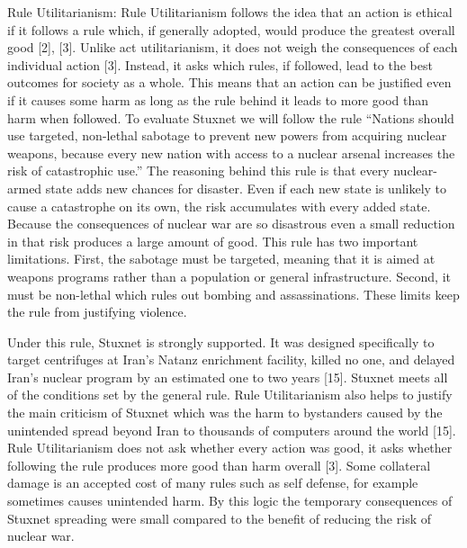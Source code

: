Rule Utilitarianism:
Rule Utilitarianism follows the idea that an action is ethical if it follows a rule which, if generally adopted, would produce the greatest overall good [2], [3]. Unlike act utilitarianism, it does not weigh the consequences of each individual action [3]. Instead, it asks which rules, if followed, lead to the best outcomes for society as a whole. This means that an action can be justified even if it causes some harm as long as the rule behind it leads to more good than harm when followed. To evaluate Stuxnet we will follow the rule “Nations should use targeted, non-lethal sabotage to prevent new powers from acquiring nuclear weapons, because every new nation with access to a nuclear arsenal increases the risk of catastrophic use.” The reasoning behind this rule is that every nuclear-armed state adds new chances for disaster. Even if each new state is unlikely to cause a catastrophe on its own, the risk accumulates with every added state. Because the consequences of nuclear war are so disastrous even a small reduction in that risk produces a large amount of good. This rule has two important limitations. First, the sabotage must be targeted, meaning that it is aimed at weapons programs rather than a population or general infrastructure. Second, it must be non-lethal which rules out bombing and assassinations. These limits keep the rule from justifying violence.

Under this rule, Stuxnet is strongly supported. It was designed specifically to target centrifuges at Iran’s Natanz enrichment facility, killed no one, and delayed Iran’s nuclear program by an estimated one to two years [15]. Stuxnet meets all of the conditions set by the general rule. Rule Utilitarianism also helps to justify the main criticism of Stuxnet which was the harm to bystanders caused by the unintended spread beyond Iran to thousands of computers around the world [15]. Rule Utilitarianism does not ask whether every action was good, it asks whether following the rule produces more good than harm overall [3]. Some collateral damage is an accepted cost of many rules such as self defense, for example sometimes causes unintended harm. By this logic the temporary consequences of Stuxnet spreading were small compared to the benefit of reducing the risk of nuclear war.


